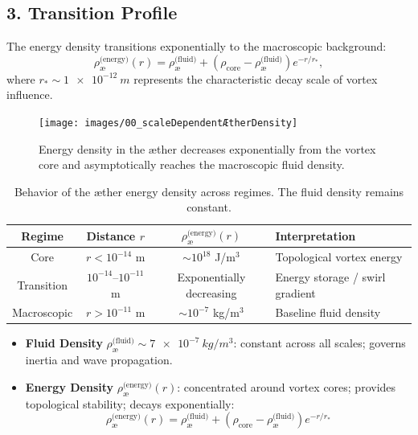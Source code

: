 \subsection*{3. Transition Profile}

The energy density transitions exponentially to the macroscopic background:
\begin{equation}
    \rho_{\text{\ae}}^{\text{(energy)}}(r) =
    \rho_{\text{\ae}}^{\text{(fluid)}} +
    \left(\rho_{\text{core}} - \rho_{\text{\ae}}^{\text{(fluid)}}\right)
    e^{-r/r_*},
\end{equation}
where \( r_* \sim \SI{1e-12}{m} \) represents the characteristic decay scale of vortex influence.

\begin{figure}[htbp]
    \centering
    \texttt{[image: images/00\_scaleDependentÆtherDensity]}
    \caption{Energy density in the æther decreases exponentially from the vortex core and asymptotically reaches the macroscopic fluid density.}
    \label{fig:vortexfields2}
\end{figure}

\begin{table}[h!]
    \centering
    \begin{tabular}{|c|c|c|l|}
        \hline
        Regime & Distance $r$ & $\rho_{\text{\ae}}^{\text{(energy)}}(r)$ & Interpretation \\
        \hline
        Core & $r < 10^{-14}$ m & $\sim 10^{18}$ J/m$^3$ & Topological vortex energy \\
        Transition & $10^{-14}$–$10^{-11}$ m & Exponentially decreasing & Energy storage / swirl gradient \\
        Macroscopic & $r > 10^{-11}$ m & $\sim 10^{-7}$ kg/m$^3$ & Baseline fluid density \\
        \hline
    \end{tabular}
    \caption{Behavior of the æther energy density across regimes. The fluid density remains constant.}
\end{table}

\begin{tcolorbox}[colback=blue!3, colframe=black!70, sharp corners=southwest, title=Æther Density Types in VAM]
    \begin{itemize}
        \item \textbf{Fluid Density} \(\rho_{\text{\ae}}^{\text{(fluid)}} \sim \SI{7e-7}{kg/m^3}\): constant across all scales; governs inertia and wave propagation.
        \item \textbf{Energy Density} \(\rho_{\text{\ae}}^{\text{(energy)}}(r)\): concentrated around vortex cores; provides topological stability; decays exponentially:
        \[
            \rho_{\text{\ae}}^{\text{(energy)}}(r) = \rho_{\text{\ae}}^{\text{(fluid)}} + \left(\rho_{\text{core}} - \rho_{\text{\ae}}^{\text{(fluid)}}\right) e^{-r/r_*}
        \]
    \end{itemize}
\end{tcolorbox}


